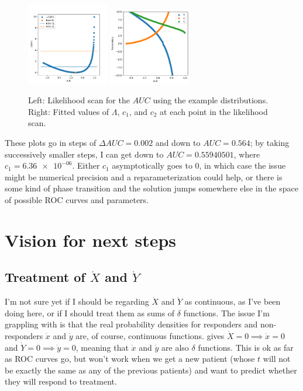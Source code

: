 \documentclass[11pt]{article}
\newcommand{\xdot}{\dot{x}}
\newcommand{\ydot}{\dot{y}}
\newcommand{\Xdot}{\dot{X}}
\newcommand{\Ydot}{\dot{Y}}
\newcommand{\AUC}{AUC}
\begin{document}
\begin{figure}
\begin{center}
\includegraphics[width=0.32\textwidth]{examplescan.pdf}
\includegraphics[width=0.32\textwidth]{exampleparameters.pdf}
\caption{Left: Likelihood scan for the \(\AUC\) using the example distributions.  Right: Fitted values of \(\Lambda\), \(c_1\), and \(c_2\) at each point in the likelihood scan.}
\label{fig:examplelikelihoodscan}
\end{center}
\end{figure}

These plots go in steps of \(\Delta\AUC=\num{0.002}\) and down to \(\AUC=\num{0.564}\); by taking successively smaller steps, I can get down to \(\AUC=\num{0.55940501}\), where \(c_1=\num{6.36e-06}\).  Either \(c_1\) asymptotically goes to 0, in which case the issue might be numerical precision and a reparameterization could help, or there is some kind of phase transition and the solution jumps somewhere else in the space of possible ROC curves and parameters.

\section{Vision for next steps}

\subsection{Treatment of \texorpdfstring{\(\Xdot\)}{X dot} and \texorpdfstring{\(\Ydot\)}{Y dot}}
\label{sec:deltafunctions}

I'm not sure yet if I should be regarding \(\Xdot\) and \(\Ydot\) as continuous, as I've been doing here, or if I should treat them as sums of \(\delta\) functions.  The issue I'm grappling with is that the real probability densities for responders and non-responders \(\xdot\) and \(\ydot\) are, of course, continuous functions.   gives \(\Xdot=0\implies\xdot=0\) and \(\Ydot=0\implies\ydot=0\), meaning that \(\xdot\) and \(\ydot\) are also \(\delta\) functions.  This is ok as far as ROC curves go, but won't work when we get a new patient (whose \(t\) will not be exactly the same as any of the previous patients) and want to predict whether they will respond to treatment.
\end{document}

